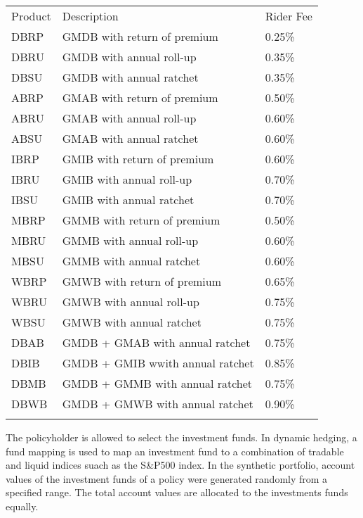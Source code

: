 \renewcommand{\arraystretch}{1.5}
\begin{center}
\begin{tabular}{l l l}
		\topline
		\headcol Product & Description                 & Rider Fee  \\
		\midline
		DBRP    & GMDB with return of premium & 0.25\%     \\
		DBRU    & GMDB with annual roll-up     & 0.35\%     \\
		DBSU    & GMDB with annual ratchet     & 0.35\%     \\
		ABRP    & GMAB with return of premium & 0.50\%     \\
		ABRU    & GMAB with annual roll-up     & 0.60\%     \\
		ABSU    & GMAB with annual ratchet     & 0.60\%     \\
		IBRP    & GMIB with return of premium & 0.60\%     \\
		IBRU    & GMIB with annual roll-up     & 0.70\%     \\
		IBSU    & GMIB with annual ratchet     & 0.70\%     \\
		MBRP    & GMMB with return of premium & 0.50\%     \\
		MBRU    & GMMB with annual roll-up     & 0.60\%     \\
		MBSU    & GMMB with annual ratchet     & 0.60\%     \\
		WBRP    & GMWB with return of premium & 0.65\%     \\
		WBRU    & GMWB with annual roll-up     & 0.75\%     \\
		WBSU    & GMWB with annual ratchet     & 0.75\%     \\
		DBAB    & GMDB + GMAB with annual ratchet & 0.75\%     \\
		DBIB    & GMDB + GMIB wwith annual ratchet     & 0.85\%     \\
		DBMB    & GMDB + GMMB with annual ratchet     & 0.75\%     \\
		DBWB    & GMDB + GMWB with annual ratchet & 0.90\% \\
		\bottomlinec
\end{tabular}
\end{center}

The policyholder is allowed to select the investment funds. In dynamic hedging, a fund mapping is used to map an investment fund to a combination of tradable and liquid indices suach as the S\&P500 index. In the synthetic portfolio, account values of the investment funds of a policy were generated randomly from a specified range. The total account values are allocated to the investments funds equally. 

